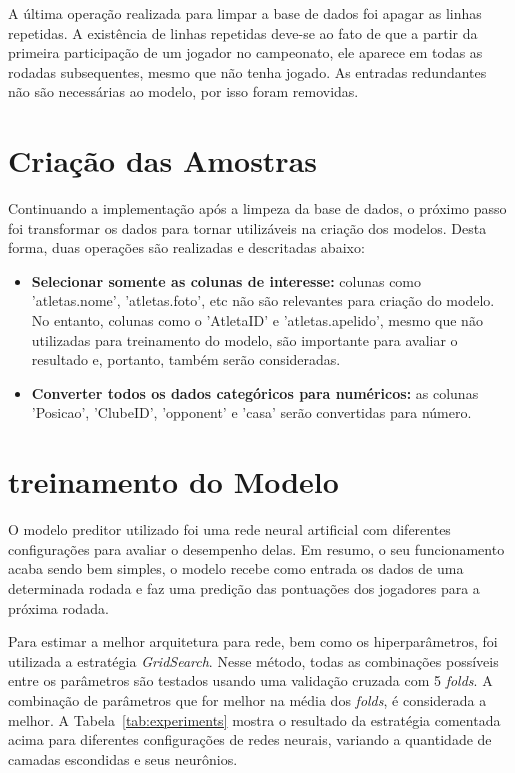 \documentclass[conference]{IEEEtran}
\newcommand{\rtab}[1]{Tabela~\ref{tab:#1}}
\newcommand{\tit}[1]{{\textit{#1}}}
\begin{document}
A última operação realizada para limpar  a base de dados foi apagar
as  linhas repetidas.  A existência  de linhas  repetidas deve-se  ao
fato  de que  a partir  da primeira  participação de  um jogador  no
campeonato, ele  aparece em todas  as rodadas subsequentes,  mesmo que
não tenha jogado.  As entradas redundantes não  são necessárias ao
modelo, por isso foram removidas.

\section{Criação das Amostras}

Continuando  a implementação  após a  limpeza da  base de  dados, o
próximo passo  foi transformar os  dados para tornar  utilizáveis na
criação dos modelos. Desta forma, duas operações são realizadas e
descritadas abaixo:

\begin{itemize}

\item  \textbf{Selecionar somente  as colunas  de interesse:}  colunas
como  'atletas.nome', 'atletas.foto',  etc não  são relevantes  para
criação  do  modelo.  No  entanto,   colunas  como  o  'AtletaID'  e
'atletas.apelido',  mesmo  que  não utilizadas  para  treinamento  do
modelo, são importante para avaliar  o resultado e, portanto, também
serão consideradas.

\item \textbf{Converter todos os  dados categóricos para numéricos:}
as   colunas  'Posicao',   'ClubeID',  'opponent'   e  'casa'   serão
convertidas para número.

\end{itemize}


\section{treinamento do Modelo}

O  modelo  preditor  utilizado  foi uma  rede  neural  artificial  com
diferentes configurações para avaliar o desempenho delas. Em resumo,
o  seu funcionamento  acaba sendo  bem simples,  o modelo  recebe como
entrada os  dados de uma determinada  rodada e faz uma  predição das
pontuações dos jogadores para a próxima rodada.

Para   estimar  a   melhor  arquitetura   para  rede,   bem  como   os
hiperparâmetros,  foi  utilizada a  estratégia  \textit{GridSearch}.
Nesse método, todas as  combinações possíveis entre os parâmetros
são  testados usando  uma validação  cruzada com  5 \tit{folds}.  A
combinação de parâmetros que for  melhor na média dos \tit{folds},
é  considerada  a melhor.  A  \rtab{experiments}  mostra o  resultado
da  estratégia comentada  acima  para  diferentes configurações  de
redes  neurais, variando  a quantidade  de camadas  escondidas e  seus
neurônios.
\end{document}
